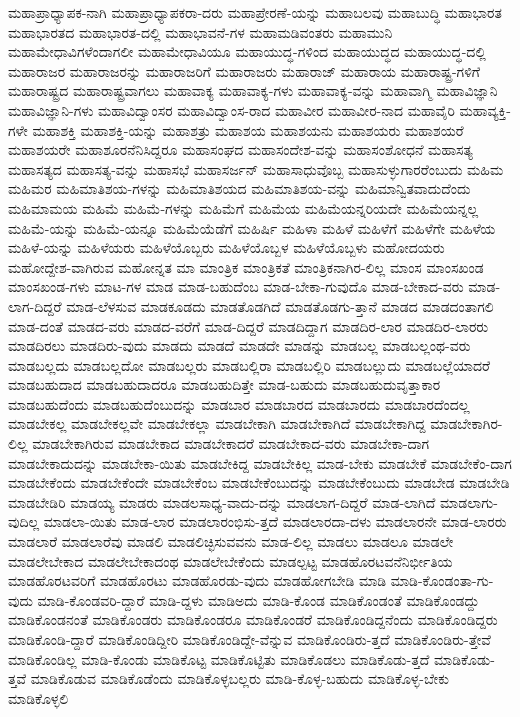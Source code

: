 {ಮಹಾಪ್ರಾಧ್ಯಾಪಕ-ನಾಗಿ
ಮಹಾಪ್ರಾಧ್ಯಾಪಕರಾ-ದರು
ಮಹಾಪ್ರೇರಣೆ-ಯನ್ನು
ಮಹಾಬಲವು
ಮಹಾಬುದ್ಧಿ
ಮಹಾಭಾರತ
ಮಹಾಭಾರತದ
ಮಹಾಭಾರತ-ದಲ್ಲಿ
ಮಹಾಭಾವನೆ-ಗಳ
ಮಹಾಮಡಿವಂತರು
ಮಹಾಮುನಿ
ಮಹಾಮೇಧಾವಿಗಳೆಂದಾಗಲೀ
ಮಹಾಮೇಧಾವಿಯೂ
ಮಹಾಯುದ್ಧ-ಗಳಿಂದ
ಮಹಾಯುದ್ಧದ
ಮಹಾಯುದ್ಧ-ದಲ್ಲಿ
ಮಹಾರಾಜರ
ಮಹಾರಾಜರನ್ನು
ಮಹಾರಾಜರಿಗೆ
ಮಹಾರಾಜರು
ಮಹಾರಾಜ್
ಮಹಾರಾಯ
ಮಹಾರಾಷ್ಟ್ರ-ಗಳಿಗೆ
ಮಹಾರಾಷ್ಟ್ರದ
ಮಹಾರಾಷ್ಟ್ರವಾಗಲು
ಮಹಾವಾಕ್ಯ
ಮಹಾವಾಕ್ಯ-ಗಳು
ಮಹಾವಾಕ್ಯ-ವನ್ನು
ಮಹಾವಾಗ್ಮಿ
ಮಹಾವಿಜ್ಞಾನಿ
ಮಹಾವಿಜ್ಞಾನಿ-ಗಳು
ಮಹಾವಿದ್ವಾಂಸರ
ಮಹಾವಿದ್ವಾಂಸ-ರಾದ
ಮಹಾವೀರ
ಮಹಾವೀರ-ನಾದ
ಮಹಾವೈರಿ
ಮಹಾವ್ಯಕ್ತಿ-ಗಳೇ
ಮಹಾಶಕ್ತಿ
ಮಹಾಶಕ್ತಿ-ಯನ್ನು
ಮಹಾಶತ್ರು
ಮಹಾಶಯ
ಮಹಾಶಯನು
ಮಹಾಶಯರು
ಮಹಾಶಯರೆ
ಮಹಾಶಯರೇ
ಮಹಾಶೂರನೆನಿಸಿದ್ದರೂ
ಮಹಾಸಂಘದ
ಮಹಾಸಂದೇಶ-ವನ್ನು
ಮಹಾಸಂಶೋಧನೆ
ಮಹಾಸತ್ಯ
ಮಹಾಸತ್ಯದ
ಮಹಾಸತ್ಯ-ವನ್ನು
ಮಹಾಸಭೆ
ಮಹಾಸರ್ಜನ್
ಮಹಾಸಾಧುವೊಬ್ಬ
ಮಹಾಸುಳ್ಳುಗಾರರೆಂಬುದು
ಮಹಿಮ
ಮಹಿಮರ
ಮಹಿಮಾತಿಶಯ-ಗಳನ್ನು
ಮಹಿಮಾತಿಶಯದ
ಮಹಿಮಾತಿಶಯ-ವನ್ನು
ಮಹಿಮಾನ್ವಿತವಾದುದೆಂದು
ಮಹಿಮಾಮಯ
ಮಹಿಮೆ
ಮಹಿಮೆ-ಗಳನ್ನು
ಮಹಿಮೆಗೆ
ಮಹಿಮೆಯ
ಮಹಿಮೆಯನ್ನರಿಯದೇ
ಮಹಿಮೆಯನ್ನಲ್ಲ
ಮಹಿಮೆ-ಯನ್ನು
ಮಹಿಮೆ-ಯನ್ನೂ
ಮಹಿಮೆಯೆಡೆಗೆ
ಮಹಿರ್ಷಿ
ಮಹಿಳಾ
ಮಹಿಳೆ
ಮಹಿಳೆಗೆ
ಮಹಿಳೆಗೇ
ಮಹಿಳೆಯ
ಮಹಿಳೆ-ಯನ್ನು
ಮಹಿಳೆಯರು
ಮಹಿಳೆಯೊಬ್ಬರು
ಮಹಿಳೆಯೊಬ್ಬಳ
ಮಹಿಳೆಯೊಬ್ಬಳು
ಮಹೋದಯರು
ಮಹೋದ್ದೇಶ-ವಾಗಿರುವ
ಮಹೋನ್ನತ
ಮಾ
ಮಾಂತ್ರಿಕ
ಮಾಂತ್ರಿಕತೆ
ಮಾಂತ್ರಿಕನಾಗಿರ-ಲಿಲ್ಲ
ಮಾಂಸ
ಮಾಂಸಖಂಡ
ಮಾಂಸಖಂಡ-ಗಳು
ಮಾಟ-ಗಳ
ಮಾಡ
ಮಾಡ-ಬಹುದೆಂಬ
ಮಾಡ-ಬೇಕಾ-ಗುವುದೊ
ಮಾಡ-ಬೇಕಾದ-ವರು
ಮಾಡ-ಲಾಗ-ದಿದ್ದರೆ
ಮಾಡ-ಲೆಳಸುವ
ಮಾಡಕೂಡದು
ಮಾಡತೊಡಗಿದೆ
ಮಾಡತೊಡಗು-ತ್ತಾನೆ
ಮಾಡದ
ಮಾಡದಂತಾಗಲಿ
ಮಾಡ-ದಂತೆ
ಮಾಡದ-ವರು
ಮಾಡದ-ವರೆಗೆ
ಮಾಡ-ದಿದ್ದರೆ
ಮಾಡದಿದ್ದಾಗ
ಮಾಡದಿರ-ಲಾರ
ಮಾಡದಿರ-ಲಾರರು
ಮಾಡದಿರಲು
ಮಾಡದಿರು-ವುದು
ಮಾಡದು
ಮಾಡದೆ
ಮಾಡದೇ
ಮಾಡನ್ನು
ಮಾಡಬಲ್ಲ
ಮಾಡಬಲ್ಲಂಥ-ವರು
ಮಾಡಬಲ್ಲದು
ಮಾಡಬಲ್ಲದೋ
ಮಾಡಬಲ್ಲರು
ಮಾಡಬಲ್ಲಿರಾ
ಮಾಡಬಲ್ಲಿರಿ
ಮಾಡಬಲ್ಲುದು
ಮಾಡಬಲ್ಲೆಯಾದರೆ
ಮಾಡಬಹುದಾದ
ಮಾಡಬಹುದಾದರೂ
ಮಾಡಬಹುದಿತ್ತೇ
ಮಾಡ-ಬಹುದು
ಮಾಡಬಹುದುವೃತ್ತಾಕಾರ
ಮಾಡಬಹುದೆಂದು
ಮಾಡಬಹುದೆಂಬುದನ್ನು
ಮಾಡಬಾರ
ಮಾಡಬಾರದ
ಮಾಡಬಾರದು
ಮಾಡಬಾರದೆಂದಲ್ಲ
ಮಾಡಬೇಕಲ್ಲ
ಮಾಡಬೇಕಲ್ಲವೇ
ಮಾಡಬೇಕಲ್ಲಾ
ಮಾಡಬೇಕಾಗಿ
ಮಾಡಬೇಕಾಗಿದೆ
ಮಾಡಬೇಕಾಗಿದ್ದ
ಮಾಡಬೇಕಾಗಿರ-ಲಿಲ್ಲ
ಮಾಡಬೇಕಾಗಿರುವ
ಮಾಡಬೇಕಾದ
ಮಾಡಬೇಕಾದರೆ
ಮಾಡಬೇಕಾದ-ವರು
ಮಾಡಬೇಕಾ-ದಾಗ
ಮಾಡಬೇಕಾದುದನ್ನು
ಮಾಡಬೇಕಾ-ಯಿತು
ಮಾಡಬೇಕಿದ್ದ
ಮಾಡಬೇಕಿಲ್ಲ
ಮಾಡ-ಬೇಕು
ಮಾಡಬೇಕೆ
ಮಾಡಬೇಕೆಂ-ದಾಗ
ಮಾಡಬೇಕೆಂದು
ಮಾಡಬೇಕೆಂದೇ
ಮಾಡಬೇಕೆಂಬ
ಮಾಡಬೇಕೆಂಬುದನ್ನು
ಮಾಡಬೇಕೆಂಬುದು
ಮಾಡಬೇಡ
ಮಾಡಬೇಡಿ
ಮಾಡಬೇಡಿರಿ
ಮಾಡಯ್ಯ
ಮಾಡರು
ಮಾಡಲಸಾಧ್ಯ-ವಾದು-ದನ್ನು
ಮಾಡಲಾಗ-ದಿದ್ದರೆ
ಮಾಡ-ಲಾಗಿದೆ
ಮಾಡಲಾಗು-ವುದಿಲ್ಲ
ಮಾಡಲಾ-ಯಿತು
ಮಾಡ-ಲಾರ
ಮಾಡಲಾರಂಭಿಸು-ತ್ತದೆ
ಮಾಡಲಾರದಾ-ದಳು
ಮಾಡಲಾರನೇ
ಮಾಡ-ಲಾರರು
ಮಾಡಲಾರೆ
ಮಾಡಲಾರೆವು
ಮಾಡಲಿ
ಮಾಡಲಿಚ್ಛಿಸುವವನು
ಮಾಡ-ಲಿಲ್ಲ
ಮಾಡಲು
ಮಾಡಲೂ
ಮಾಡಲೇ
ಮಾಡಲೇಬೇಕಾದ
ಮಾಡಲೇಬೇಕಾದಂಥ
ಮಾಡಲೇಬೇಕೆಂದು
ಮಾಡಲ್ಪಟ್ಟ
ಮಾಡಹೊರಟವನೆನಿರ್ಭೀತಿಯ
ಮಾಡಹೊರಟವರಿಗೆ
ಮಾಡಹೊರಟು
ಮಾಡಹೊರಡು-ವುದು
ಮಾಡಹೋಗಬೇಡಿ
ಮಾಡಿ
ಮಾಡಿ-ಕೊಂಡಂತಾ-ಗು-ವುದು
ಮಾಡಿ-ಕೊಂಡವರಿ-ದ್ದಾರೆ
ಮಾಡಿ-ದ್ದಳು
ಮಾಡಿಅದು
ಮಾಡಿ-ಕೊಂಡ
ಮಾಡಿಕೊಂಡಂತೆ
ಮಾಡಿಕೊಂಡದ್ದು
ಮಾಡಿಕೊಂಡನಂತೆ
ಮಾಡಿಕೊಂಡರು
ಮಾಡಿಕೊಂಡರೂ
ಮಾಡಿಕೊಂಡರೆ
ಮಾಡಿಕೊಂಡಿದ್ದನೆಂದು
ಮಾಡಿಕೊಂಡಿದ್ದರು
ಮಾಡಿಕೊಂಡಿ-ದ್ದಾರೆ
ಮಾಡಿಕೊಂಡಿದ್ದೀರಿ
ಮಾಡಿಕೊಂಡಿದ್ದೇ-ವೆನ್ನುವ
ಮಾಡಿಕೊಂಡಿರು-ತ್ತದೆ
ಮಾಡಿಕೊಂಡಿರು-ತ್ತೇವೆ
ಮಾಡಿಕೊಂಡಿಲ್ಲ
ಮಾಡಿ-ಕೊಂಡು
ಮಾಡಿಕೊಟ್ಟ
ಮಾಡಿಕೊಟ್ಟಿತು
ಮಾಡಿಕೊಡಲು
ಮಾಡಿಕೊಡು-ತ್ತದೆ
ಮಾಡಿಕೊಡು-ತ್ತವೆ
ಮಾಡಿಕೊಡುವ
ಮಾಡಿಕೊಡೆಂದು
ಮಾಡಿಕೊಳ್ಳಬಲ್ಲರು
ಮಾಡಿ-ಕೊಳ್ಳ-ಬಹುದು
ಮಾಡಿಕೊಳ್ಳ-ಬೇಕು
ಮಾಡಿಕೊಳ್ಳಲಿ
}
